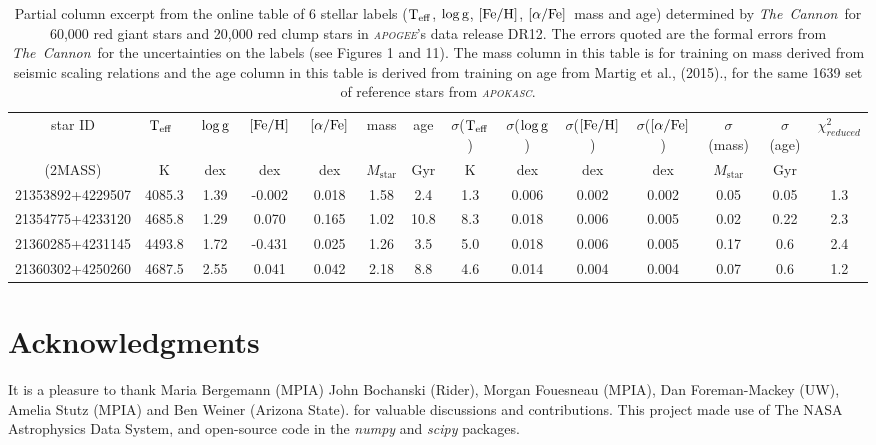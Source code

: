 \documentclass[12pt, preprint]{aastex}
\newcommand{\project}[1]{\textsl{#1}}
\newcommand{\tc}{\project{The~Cannon}}
\newcommand{\apogee}{\project{\textsc{apogee}}}
\newcommand{\apokasc}{\project{\textsc{apokasc}}}
\newcommand{\teff}{\mbox{$\rm T_{eff}$}}
\newcommand{\feh}{\mbox{$\rm [Fe/H]$}}
\newcommand{\alphafe}{\mbox{$\rm [\alpha/Fe]$}}
\newcommand{\logg}{\mbox{$\rm \log g$}}
\begin{document}
\begin{table}[p]
\tiny{
\centering
\caption{Partial column excerpt from the online table of 6 stellar labels (\teff, \logg, \feh, \alphafe\ mass and age) determined by \tc\ for 60,000 red giant stars and 20,000 red clump stars in \apogee 's data release DR12. The errors quoted are the formal errors from \tc\ for the uncertainties on the labels (see Figures 1 and 11). The mass column in this table is for training on mass derived from seismic scaling relations and the age column in this table is derived from training on age from Martig et al., (2015)., for the same 1639 set of reference stars from \apokasc. } 

\vspace{10pt}
\begin{tabular}{| c | c | c |  c | c | c |  c | c | c | c | c | c | c | c |} %
\hline
\tiny{star ID}  & \teff\ & \logg\ & \feh\ & \alphafe\ & mass & \tiny{age} & $\sigma$(\teff) & $\sigma$(\logg) & $\sigma$(\feh) & $\sigma$(\alphafe) & $\sigma$(mass) & $\sigma$(age) & $\chi_{reduced}^2$  \\
\tiny{(2MASS)} & K & dex &  dex  & dex & $ M_{\mbox{star}}$ & Gyr & K & dex  & dex & dex &$ M_{\mbox{star}}$ & Gyr  & \\    
\hline
\tiny{21353892+4229507} & 4085.3 & 1.39  & -0.002  & 0.018 & 1.58  & 2.4 & 1.3 & 0.006 & 0.002 & 0.002 &  0.05 & 0.05 &  1.3 \\
\tiny{21354775+4233120} & 4685.8 & 1.29 & 0.070  & 0.165 & 1.02  & 10.8 &  8.3  & 0.018 & 0.006 & 0.005 &  0.02 &  0.22 & 2.3\\
\tiny{21360285+4231145} & 4493.8 & 1.72  & -0.431  & 0.025 &  1.26  & 3.5 & 5.0 & 0.018 & 0.006 & 0.005 & 0.17 & 0.6 & 2.4 \\
\tiny{21360302+4250260} & 4687.5 & 2.55  & 0.041 & 0.042 & 2.18  & 8.8 & 4.6    & 0.014 & 0.004 & 0.004 & 0.07 & 0.6 & 1.2\\
\hline
\end{tabular}
\label{tab:online} }
\end{table}



\section*{Acknowledgments}
It is a pleasure to thank Maria Bergemann (MPIA)
  John Bochanski (Rider), Morgan Fouesneau (MPIA),
  Dan Foreman-Mackey (UW), Amelia Stutz (MPIA) and Ben Weiner (Arizona State).
for valuable discussions and contributions.
This project made use of
  The NASA Astrophysics Data System,
  and open-source code in the \project{numpy} and \project{scipy} packages.
  
\end{document}
